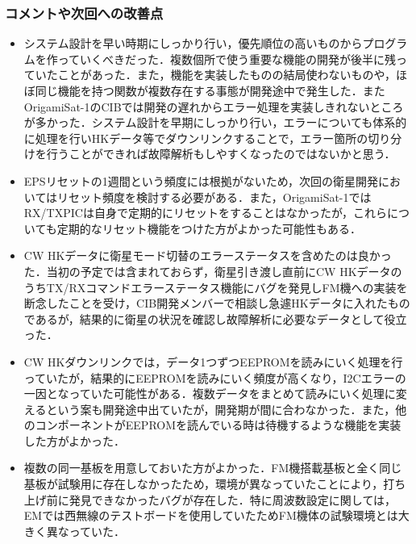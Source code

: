 \subsubsection{コメントや次回への改善点}
\begin{itemize}
	\item システム設計を早い時期にしっかり行い，優先順位の高いものからプログラムを作っていくべきだった．複数個所で使う重要な機能の開発が後半に残っていたことがあった．また，機能を実装したものの結局使わないものや，ほぼ同じ機能を持つ関数が複数存在する事態が開発途中で発生した．またOrigamiSat-1のCIBでは開発の遅れからエラー処理を実装しきれないところが多かった．システム設計を早期にしっかり行い，エラーについても体系的に処理を行いHKデータ等でダウンリンクすることで，エラー箇所の切り分けを行うことができれば故障解析もしやすくなったのではないかと思う．
	\item EPSリセットの1週間という頻度には根拠がないため，次回の衛星開発においてはリセット頻度を検討する必要がある．また，OrigamiSat-1ではRX/TXPICは自身で定期的にリセットをすることはなかったが，これらについても定期的なリセット機能をつけた方がよかった可能性もある．
	\item CW HKデータに衛星モード切替のエラーステータスを含めたのは良かった．当初の予定では含まれておらず，衛星引き渡し直前にCW HKデータのうちTX/RXコマンドエラーステータス機能にバグを発見しFM機への実装を断念したことを受け，CIB開発メンバーで相談し急遽HKデータに入れたものであるが，結果的に衛星の状況を確認し故障解析に必要なデータとして役立った．
	\item CW HKダウンリンクでは，データ1つずつEEPROMを読みにいく処理を行っていたが，結果的にEEPROMを読みにいく頻度が高くなり，I2Cエラーの一因となっていた可能性がある．複数データをまとめて読みにいく処理に変えるという案も開発途中出ていたが，開発期が間に合わなかった．また，他のコンポーネントがEEPROMを読んでいる時は待機するような機能を実装した方がよかった．
	\item 複数の同一基板を用意しておいた方がよかった．FM機搭載基板と全く同じ基板が試験用に存在しなかったため，環境が異なっていたことにより，打ち上げ前に発見できなかったバグが存在した．特に周波数設定に関しては，EMでは西無線のテストボードを使用していたためFM機体の試験環境とは大きく異なっていた．
	
\end{itemize}
